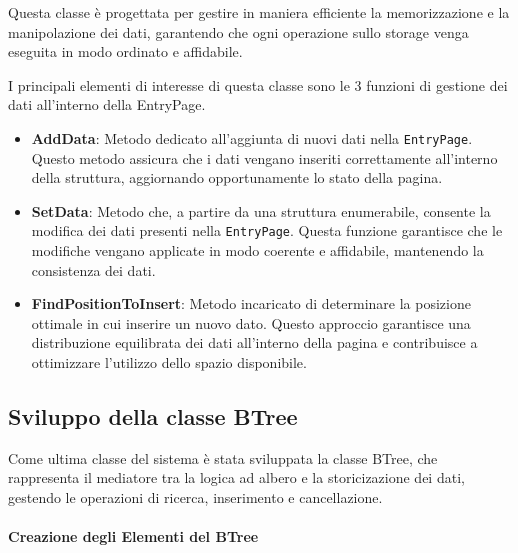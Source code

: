 \documentclass[12pt,a4paper,openright,twoside]{book}
\begin{document}
                Questa classe è progettata per gestire in maniera efficiente la memorizzazione e la manipolazione dei dati, garantendo che ogni operazione sullo storage venga eseguita in modo ordinato e affidabile.

                

                I principali elementi di interesse di questa classe sono le 3 funzioni di gestione dei dati all'interno della EntryPage.

                \begin{itemize}
                    \item \textbf{AddData}: Metodo dedicato all'aggiunta di nuovi dati nella \texttt{EntryPage}. Questo metodo assicura che i dati vengano inseriti correttamente all'interno della struttura, aggiornando opportunamente lo stato della pagina.
                    \item \textbf{SetData}: Metodo che, a partire da una struttura enumerabile, consente la modifica dei dati presenti nella \texttt{EntryPage}.
                    Questa funzione garantisce che le modifiche vengano applicate in modo coerente e affidabile, mantenendo la consistenza dei dati.
                    \item \textbf{FindPositionToInsert}: Metodo incaricato di determinare la posizione ottimale in cui inserire un nuovo dato. Questo approccio garantisce una distribuzione equilibrata dei dati all'interno della pagina e contribuisce a ottimizzare l'utilizzo dello spazio disponibile.
                \end{itemize}

            \subsection{Sviluppo della classe BTree}

                Come ultima classe del sistema è stata sviluppata la classe BTree, che rappresenta il mediatore tra la logica ad albero e la storicizazione dei dati, gestendo le operazioni di ricerca, inserimento e cancellazione.

                \paragraph{Creazione degli Elementi del BTree}

                    
\end{document}
